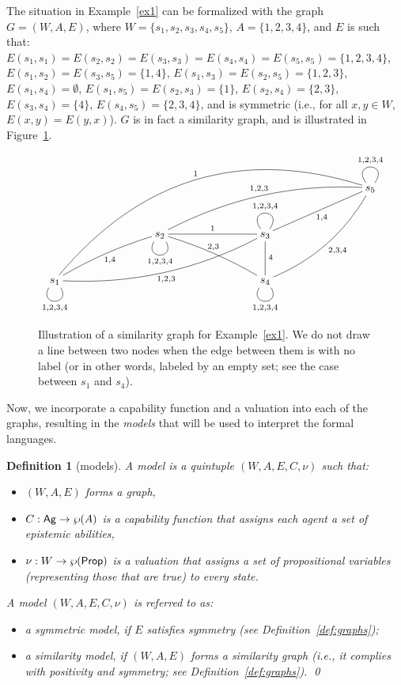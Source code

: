 \documentclass{article}
\newtheorem{definition}[theorem]{Definition}%
\newcommand{\ab}{\ensuremath{A}\xspace}
\newcommand{\ag}{\text{\normalfont\textsf{Ag}}\xspace}
\newcommand{\prop}{\text{\normalfont\textsf{Prop}}\xspace}
\begin{document}
The situation in Example~\ref{ex1} can be formalized with the graph $G = (W,\ab,E)$, where $W = \{ s_1, s_2, s_3, s_4, s_5 \}$, $\ab = \{ 1, 2, 3, 4 \}$, and $E$ is such that:
%
$E(s_1,s_1) = E(s_2,s_2) = E(s_3,s_3) = E(s_4,s_4) = E(s_5,s_5) = \{ 1, 2, 3, 4 \}$,
$E(s_1,s_2) = E(s_3, s_5) = \{ 1, 4\}$,
$E(s_1,s_3) = E(s_2,s_5) = \{ 1, 2, 3\}$,
$E(s_1,s_4) = \emptyset$,
$E(s_1,s_5) = E(s_2, s_3) = \{ 1 \}$,
$E(s_2,s_4) = \{ 2, 3 \}$,
$E(s_3,s_4) = \{ 4 \}$,
$E(s_4,s_5) = \{ 2, 3, 4 \}$,
and is symmetric (i.e., for all $x,y \in W$, $E(x,y) = E(y,x)$). $G$ is in fact a similarity graph, and is illustrated in Figure~\ref{fig:sim-graph}.%

\begin{figure}
\centering
$\xymatrix@R=3em@C=8em{
&&&s_5
\ar@{-}@(ul,ur)^{1, 2, 3, 4}
\\
&s_2
\ar@{-}@(dl,dr)_{1, 2, 3, 4}
\ar@{-}[r]^{1}
\ar@{-}@/^.3pc/[dr]^{\hspace{-6pt}2, 3}
\ar@{-}@/^1.2pc/[urr]^{1, 2, 3}
& s_3
\ar@{-}@(ul,ur)^{1, 2, 3, 4}
\ar@{-}[d]^{4}
\ar@{-}[ru]_{1, 4}
\\
s_1
\ar@{-}@(dl,dr)_{1, 2, 3, 4}
\ar@{-}@/^.3pc/[ur]_{1, 4}
\ar@{-}@/_1.2pc/[rru]_{1, 2, 3}
\ar@{-}@/^4.3pc/[uurrr]^{1}
&
&s_4
\ar@{-}@(dl,dr)_{1, 2, 3, 4}
\ar@{-}@/_1pc/[uur]_{2,3,4}
}$
\caption{Illustration of a similarity graph for Example~\ref{ex1}. We do not draw a line between two nodes when the edge between them is with no label (or in other words, labeled by an empty set; see the case between $s_1$ and $s_4$).}\label{fig:sim-graph}
\end{figure}

Now, we incorporate a capability function and a valuation into each of the graphs, resulting in the \emph{models} that will be used to interpret the formal languages.

\begin{definition}[models]\label{def:models}
A \emph{model} is a quintuple $(W,\ab,E,C,\nu)$ such that:
\begin{itemize}
\item $(W,\ab,E)$ forms a graph,
\item $C: \ag \to \wp(\ab)$ is a capability function that assigns each agent a set of epistemic abilities,
\item $\nu: W \to \wp(\prop)$ is a valuation that assigns a set of propositional variables (representing those that are true) to every state.
\end{itemize}

A model $(W,\ab,E,C,\nu)$ is referred to as:
\begin{itemize}
\item a \emph{symmetric model}, if $E$ satisfies symmetry (see Definition~\ref{def:graphs});
\item a \emph{similarity model}, if $(W,\ab,E)$ forms a similarity graph (i.e., it complies with positivity and symmetry; see Definition~\ref{def:graphs}).
\qed
\end{itemize}
\end{definition}
\end{document}

